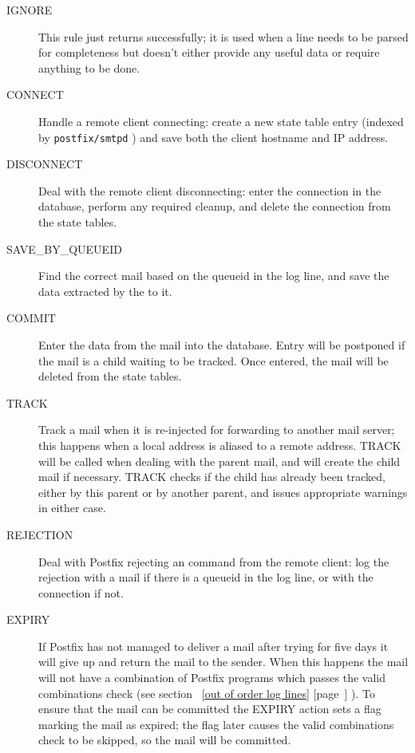 \documentclass[a4paper,12pt,draft]{article}
\newcommand{\refwithpage}[1]{%
    \empty{}\ref{#1} [page~\pageref{#1}]%
}
\newcommand{\daemon}[1]{%
    \texttt{postfix/#1}%
}
\begin{document}
\begin{description}

    \item [IGNORE] This rule just returns successfully; it is used when a
        line needs to be parsed for completeness but doesn't either provide
        any useful data or require anything to be done.

    \item [CONNECT] Handle a remote client connecting: create a new state
        table entry (indexed by \daemon{smtpd} \pid{}) and save both the
        client hostname and IP address.

    \item [DISCONNECT] Deal with the remote client disconnecting: enter the
        connection in the database, perform any required cleanup, and
        delete the connection from the state tables.

    \item [SAVE\_BY\_QUEUEID] Find the correct mail based on the queueid in
        the log line, and save the data extracted by the \regex{} to it.

    \item [COMMIT] Enter the data from the mail into the database. Entry
        will be postponed if the mail is a child waiting to be tracked.
        Once entered, the mail will be deleted from the state tables.

    \item [TRACK] Track a mail when it is re-injected for forwarding to
        another mail server; this happens when a local address is aliased
        to a remote address.  TRACK will be called when dealing with the
        parent mail, and will create the child mail if necessary. TRACK
        checks if the child has already been tracked, either by this parent
        or by another parent, and issues appropriate warnings in either
        case.

    \item [REJECTION] Deal with Postfix rejecting an \SMTP{} command from
        the remote client: log the rejection with a mail if there is a
        queueid in the log line, or with the connection if not.

    \item [EXPIRY] If Postfix has not managed to deliver a mail after
        trying for five days it will give up and return the mail to the
        sender.  When this happens the mail will not have a combination of
        Postfix programs which passes the valid combinations check (see
        section~\refwithpage{out of order log lines}).  To ensure that the
        mail can be committed the EXPIRY action sets a flag marking the
        mail as expired; the flag later causes the valid combinations check
        to be skipped, so the mail will be committed.


\end{description}
\end{document}
